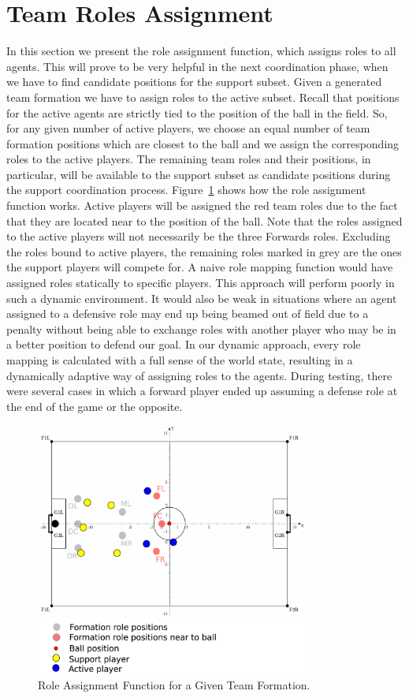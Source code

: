 \section{Team Roles Assignment}
In this section we present the role assignment function, which assigns roles to all agents. This will prove to be very helpful in the next coordination phase, when we have to find candidate positions for the support subset. Given a generated team formation we have to assign roles to the active subset. Recall that positions for the active agents are strictly tied to the position of the ball in the field. So, for any given number of active players, we choose an equal number of team formation positions which are closest to the ball and we assign the corresponding roles to the active players. The remaining team roles and their positions, in particular, will be available to the support subset as candidate positions during the support coordination process. Figure~\ref{fig:RoleAss} shows how the role assignment function works. Active players will be assigned the red team roles due to the fact that they are located near to the position of the ball. Note that the roles assigned to the active players will not necessarily be the three Forwards roles. Excluding the roles bound to active players, the remaining roles marked in grey are the ones the support players will compete for. A naive role mapping function would have assigned roles statically to specific players. This approach will perform poorly in such a dynamic environment. It would also be weak in situations where an agent assigned to a defensive role may end up being beamed out of field due to a penalty without being able to exchange roles with another player who may be in a better position to defend our goal. In our dynamic approach, every role mapping is calculated with a full sense of the world state, resulting in a dynamically adaptive way of assigning roles to the agents. During testing, there were several cases in which a forward player ended up assuming a defense role at the end of the game or the opposite.


\begin{figure}[t!]
\centering
  \includegraphics[width=0.8\textwidth]{Chapter4/figures/RoleAss.pdf}
  \caption{Role Assignment Function for a Given Team Formation.} 
  \label{fig:RoleAss}
\end{figure}

